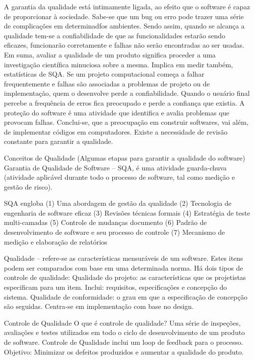 \documentclass[12pt]{article}
\begin{document}
         A garantia da qualidade está intimamente ligada, ao efeito que o software é capaz de proporcionar à sociedade. Sabe-se que um bug ou erro pode trazer uma série de complicações em determinadfos ambientes.  Sendo assim, quando se alcança a qualidade tem-se a confiabilidade de que as funcionalidades estarão sendo eficazes, funcionarão corretamente e falhas não serão encontradas ao ser usadas. Em suma, avaliar a qualidade de um produto significa proceder a uma investigação científica minuciosa sobre a mesma. Implica em medir também, estatísticas de SQA.
Se um projeto computacional começa a falhar frequentemente e falhas são associadas a problemas de projeto ou de implementação, quem o desenvolve perde a confiabilidade. Quando o usuário final percebe a frequência de erros fica preocupado e perde a confiança que existia. A proteção do software é uma atividade que identifica e avalia problemas que provocam falhas.
         Conclui-se, que a preocupação em construir softwares, vai além, de implementar códigos em computadores. Existe a necessidade de revisão constante para garantir a qualidade.
         
         
     Conceitos de Qualidade (Algumas etapas para garantir a qualidade do software)
        Garantia de Qualidade de Software – SQA, é uma atividade guarda-chuva (atividade aplicável durante todo o processo de software, tal como medição e gestão de risco). 

    SQA engloba 
    (1) Uma abordagem de gestão da qualidade 
    (2) Tecnologia de engenharia de software eficaz 
    (3) Revisões técnicas formais 
    (4) Estratégia de teste multi-camadas 
    (5) Controle de mudanças documento 
    (6) Padrão de desenvolvimento de software e seu processo de controle 
    (7) Mecanismo de medição e elaboração de relatórios
    
    Qualidade – refere-se as características mensuráveis de um software. Estes itens podem ser comparados com base em uma determinada norma.
    Há dois tipos de controle de qualidade: 
        Qualidade do projeto: as características que os projetistas especificam para um item. Inclui: requisitos, especificações e concepção do sistema. 
        Qualidade de conformidade: o grau em que a especificação de concepção são seguidas. Centra-se em implementação com base no design. 
        
        Controle de Qualidade 
        O que é controle de qualidade? Uma série de inspeções, avaliações e testes utilizados em todo o ciclo de desenvolvimento de um produto de software.
        Controle de Qualidade inclui um loop de feedback para o processo.
        Objetivo: Minimizar os defeitos produzidos e aumentar a qualidade do produto.
        
\end{document}
